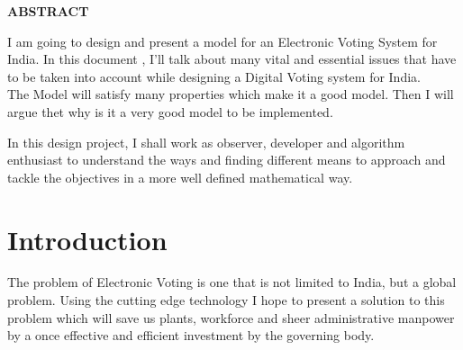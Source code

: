 \documentclass[12pt]{report}
\begin{document}
\newpage

\begin{center}
\Large \bf ABSTRACT
\end{center}
\vspace{0.2in}

I am going to design and present a model for an Electronic Voting System for India. In this document , I'll talk about many vital and essential issues that have to be taken into account while designing a Digital Voting system for India. 
\\
\vspace{0.3cm}
The Model will satisfy many properties which make it a good model. Then I will argue thet why is it a very good model to be implemented.



In this design project, I shall work as observer, developer and algorithm enthusiast to understand the ways and finding different means to approach and tackle the objectives in a more well defined mathematical way. 

\vspace{0.2cm}

\newpage

\tableofcontents

\newpage

\chapter{Introduction}

The problem of Electronic Voting is one that is not limited to India, but a global problem. Using the cutting edge technology I hope to present a solution to this problem which will save us plants, workforce and sheer administrative manpower by a once effective and efficient investment by the governing body.
\\
\end{document}
